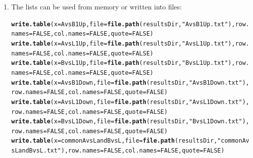 \documentclass{article}\usepackage[]{graphicx}\usepackage[]{color}
\makeatletter
\newcommand{\hlnum}[1]{\textcolor[rgb]{0.686,0.059,0.569}{#1}}%
\newcommand{\hlstr}[1]{\textcolor[rgb]{0.192,0.494,0.8}{#1}}%
\newcommand{\hlstd}[1]{\textcolor[rgb]{0.345,0.345,0.345}{#1}}%
\newcommand{\hlkwc}[1]{\textcolor[rgb]{0.333,0.667,0.333}{#1}}%
\newcommand{\hlkwd}[1]{\textcolor[rgb]{0.737,0.353,0.396}{\textbf{#1}}}%
\newenvironment{kframe}{%
 \def\at@end@of@kframe{}%
 \ifinner\ifhmode%
  \def\at@end@of@kframe{\end{minipage}}%
  \begin{minipage}{\columnwidth}%
 \fi\fi%
 \def\FrameCommand##1{\hskip\@totalleftmargin \hskip-\fboxsep
 \colorbox{shadecolor}{##1}\hskip-\fboxsep
     \hskip-\linewidth \hskip-\@totalleftmargin \hskip\columnwidth}%
 \MakeFramed {\advance\hsize-\width
   \@totalleftmargin\z@ \linewidth\hsize
   \@setminipage}}%
 {\par\unskip\endMakeFramed%
 \at@end@of@kframe}
\newenvironment{knitrout}{}{} %
\makeatother
\begin{document}
\begin{enumerate}
\item The lists can be used from memory or written into files:

\begin{knitrout}
\color{fgcolor}\begin{kframe}
\begin{alltt}
\hlkwd{write.table}\hlstd{(}\hlkwc{x}\hlstd{=AvsB1Up,} \hlkwc{file} \hlstd{=} \hlkwd{file.path}\hlstd{(resultsDir,} \hlstr{"AvsB1Up.txt"}\hlstd{),} \hlkwc{row.names}\hlstd{=}\hlnum{FALSE}\hlstd{,} \hlkwc{col.names}\hlstd{=}\hlnum{FALSE}\hlstd{,} \hlkwc{quote}\hlstd{=}\hlnum{FALSE}\hlstd{)}
\hlkwd{write.table}\hlstd{(}\hlkwc{x}\hlstd{=AvsL1Up,} \hlkwc{file} \hlstd{=} \hlkwd{file.path}\hlstd{(resultsDir,} \hlstr{"AvsL1Up.txt"}\hlstd{),} \hlkwc{row.names}\hlstd{=}\hlnum{FALSE}\hlstd{,} \hlkwc{col.names}\hlstd{=}\hlnum{FALSE}\hlstd{,} \hlkwc{quote}\hlstd{=}\hlnum{FALSE}\hlstd{)}
\hlkwd{write.table}\hlstd{(}\hlkwc{x}\hlstd{=BvsL1Up,} \hlkwc{file} \hlstd{=} \hlkwd{file.path}\hlstd{(resultsDir,} \hlstr{"BvsL1Up.txt"}\hlstd{),} \hlkwc{row.names}\hlstd{=}\hlnum{FALSE}\hlstd{,} \hlkwc{col.names}\hlstd{=}\hlnum{FALSE}\hlstd{,} \hlkwc{quote}\hlstd{=}\hlnum{FALSE}\hlstd{)}
\hlkwd{write.table}\hlstd{(}\hlkwc{x}\hlstd{=AvsB1Down,} \hlkwc{file} \hlstd{=} \hlkwd{file.path}\hlstd{(resultsDir,} \hlstr{"AvsB1Down.txt"}\hlstd{),} \hlkwc{row.names}\hlstd{=}\hlnum{FALSE}\hlstd{,} \hlkwc{col.names}\hlstd{=}\hlnum{FALSE}\hlstd{,} \hlkwc{quote}\hlstd{=}\hlnum{FALSE}\hlstd{)}
\hlkwd{write.table}\hlstd{(}\hlkwc{x}\hlstd{=AvsL1Down,} \hlkwc{file} \hlstd{=} \hlkwd{file.path}\hlstd{(resultsDir,} \hlstr{"AvsL1Down.txt"}\hlstd{),} \hlkwc{row.names}\hlstd{=}\hlnum{FALSE}\hlstd{,} \hlkwc{col.names}\hlstd{=}\hlnum{FALSE}\hlstd{,} \hlkwc{quote}\hlstd{=}\hlnum{FALSE}\hlstd{)}
\hlkwd{write.table}\hlstd{(}\hlkwc{x}\hlstd{=BvsL1Down,} \hlkwc{file} \hlstd{=} \hlkwd{file.path}\hlstd{(resultsDir,} \hlstr{"BvsL1Down.txt"}\hlstd{),} \hlkwc{row.names}\hlstd{=}\hlnum{FALSE}\hlstd{,} \hlkwc{col.names}\hlstd{=}\hlnum{FALSE}\hlstd{,} \hlkwc{quote}\hlstd{=}\hlnum{FALSE}\hlstd{)}
\hlkwd{write.table}\hlstd{(}\hlkwc{x}\hlstd{=commonAvsLandBvsL,} \hlkwc{file} \hlstd{=} \hlkwd{file.path}\hlstd{(resultsDir,} \hlstr{"commonAvsLandBvsL.txt"}\hlstd{),} \hlkwc{row.names}\hlstd{=}\hlnum{FALSE}\hlstd{,} \hlkwc{col.names}\hlstd{=}\hlnum{FALSE}\hlstd{,} \hlkwc{quote}\hlstd{=}\hlnum{FALSE}\hlstd{)}
\end{alltt}
\end{kframe}
\end{knitrout}



\end{enumerate}


\end{document}
